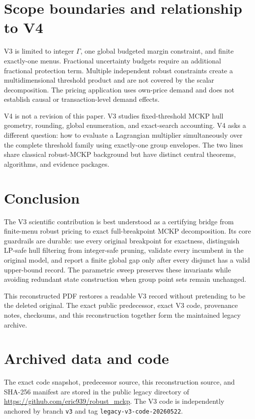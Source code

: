 \documentclass[11pt,a4paper]{article}
\theoremstyle{definition}
\theoremstyle{remark}
\begin{document}
\section{Scope boundaries and relationship to V4}

V3 is limited to integer $\Gamma$, one global budgeted margin constraint, and
finite exactly-one menus. Fractional uncertainty budgets require an additional
fractional protection term. Multiple independent robust constraints create a
multidimensional threshold product and are not covered by the scalar
decomposition. The pricing application uses own-price demand and does not
establish causal or transaction-level demand effects.

V4 is not a revision of this paper. V3 studies fixed-threshold MCKP hull
geometry, rounding, global enumeration, and exact-search accounting. V4 asks a
different question: how to evaluate a Lagrangian multiplier simultaneously
over the complete threshold family using exactly-one group envelopes. The two
lines share classical robust-MCKP background but have distinct central
theorems, algorithms, and evidence packages.

\section{Conclusion}

The V3 scientific contribution is best understood as a certifying bridge from
finite-menu robust pricing to exact full-breakpoint MCKP decomposition. Its
core guardrails are durable: use every original breakpoint for exactness,
distinguish LP-safe hull filtering from integer-safe pruning, validate every
incumbent in the original model, and report a finite global gap only after
every disjunct has a valid upper-bound record. The parametric sweep preserves
these invariants while avoiding redundant state construction when group point
sets remain unchanged.

This reconstructed PDF restores a readable V3 record without pretending to be
the deleted original. The exact public predecessor, exact V3 code, provenance
notes, checksums, and this reconstruction together form the maintained legacy
archive.

\section*{Archived data and code}

The exact code snapshot, predecessor source, this reconstruction source, and
SHA-256 manifest are stored in the public legacy directory of
\url{https://github.com/eric939/robust_mckp}. The V3 code is independently
anchored by branch \texttt{v3} and tag
\texttt{legacy-v3-code-20260522}.
\end{document}
